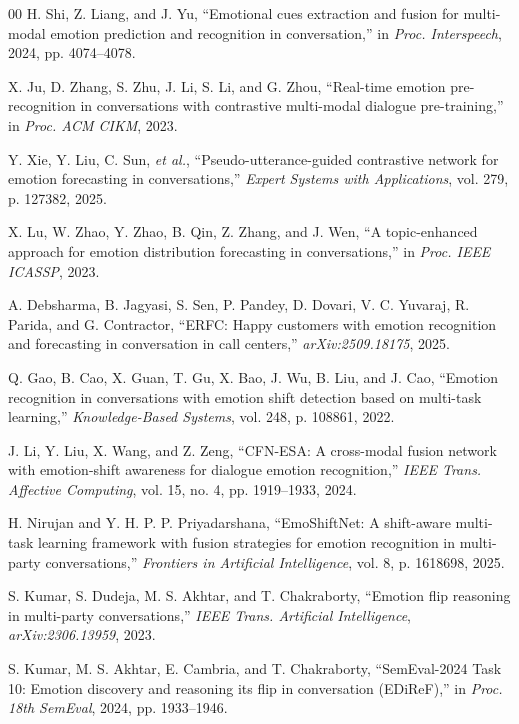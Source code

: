 \documentclass{ieeeaccess}
\begin{document}
\begin{thebibliography}{00}
 H. Shi, Z. Liang, and J. Yu, ``Emotional cues extraction and fusion for
multi-modal emotion prediction and recognition in conversation,'' in \emph{Proc. Interspeech},
2024, pp. 4074--4078.

 X. Ju, D. Zhang, S. Zhu, J. Li, S. Li, and G. Zhou, ``Real-time emotion
pre-recognition in conversations with contrastive multi-modal dialogue pre-training,'' in
\emph{Proc. ACM CIKM}, 2023.

 Y. Xie, Y. Liu, C. Sun, \emph{et al.}, ``Pseudo-utterance-guided contrastive
network for emotion forecasting in conversations,'' \emph{Expert Systems with Applications}, vol.
279, p. 127382, 2025.

 X. Lu, W. Zhao, Y. Zhao, B. Qin, Z. Zhang, and J. Wen, ``A topic-enhanced
approach for emotion distribution forecasting in conversations,'' in \emph{Proc. IEEE ICASSP},
2023.

 A. Debsharma, B. Jagyasi, S. Sen, P. Pandey, D. Dovari, V. C. Yuvaraj,
R. Parida, and G. Contractor, ``ERFC: Happy customers with emotion recognition and forecasting in
conversation in call centers,'' \emph{arXiv:2509.18175}, 2025.

 Q. Gao, B. Cao, X. Guan, T. Gu, X. Bao, J. Wu, B. Liu, and J. Cao, ``Emotion
recognition in conversations with emotion shift detection based on multi-task learning,''
\emph{Knowledge-Based Systems}, vol. 248, p. 108861, 2022.

 J. Li, Y. Liu, X. Wang, and Z. Zeng, ``CFN-ESA: A cross-modal fusion network
with emotion-shift awareness for dialogue emotion recognition,'' \emph{IEEE Trans. Affective
Computing}, vol. 15, no. 4, pp. 1919--1933, 2024.

 H. Nirujan and Y. H. P. P. Priyadarshana, ``EmoShiftNet: A
shift-aware multi-task learning framework with fusion strategies for emotion recognition in
multi-party conversations,'' \emph{Frontiers in Artificial Intelligence}, vol. 8, p. 1618698, 2025.

 S. Kumar, S. Dudeja, M. S. Akhtar, and T. Chakraborty, ``Emotion flip
reasoning in multi-party conversations,'' \emph{IEEE Trans. Artificial Intelligence},
\emph{arXiv:2306.13959}, 2023.

 S. Kumar, M. S. Akhtar, E. Cambria, and T. Chakraborty, ``SemEval-2024
Task 10: Emotion discovery and reasoning its flip in conversation (EDiReF),'' in \emph{Proc. 18th
SemEval}, 2024, pp. 1933--1946.


\end{thebibliography}
\end{document}
